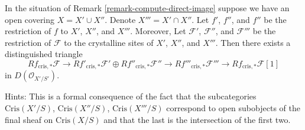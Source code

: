 \begin{remark}
\label{remark-mayer-vietoris}
In the situation of Remark \ref{remark-compute-direct-image}
suppose we have an open covering $X = X' \cup X''$. Denote
$X''' = X' \cap X''$. Let $f'$, $f''$, and $f''$ be the restriction of $f$
to $X'$, $X''$, and $X'''$. Moreover, Let $\mathcal{F}'$, $\mathcal{F}''$,
and $\mathcal{F}'''$ be the restriction of $\mathcal{F}$ to the crystalline
sites of $X'$, $X''$, and $X'''$. Then there exists a distinguished triangle
$$
Rf_{\text{cris}, *}\mathcal{F}
\longrightarrow
Rf'_{\text{cris}, *}\mathcal{F}' \oplus Rf''_{\text{cris}, *}\mathcal{F}''
\longrightarrow
Rf'''_{\text{cris}, *}\mathcal{F}'''
\longrightarrow
Rf_{\text{cris}, *}\mathcal{F}[1]
$$
in $D(\mathcal{O}_{X'/S'})$.

\medskip\noindent
Hints: This is a formal consequence of the fact that the subcategories
$\text{Cris}(X'/S)$, $\text{Cris}(X''/S)$, $\text{Cris}(X'''/S)$ correspond
to open subobjects of the final sheaf on $\text{Cris}(X/S)$ and that the
last is the intersection of the first two.
\end{remark}

